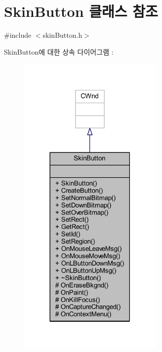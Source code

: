 \hypertarget{class_skin_button}{}\section{Skin\+Button 클래스 참조}
\label{class_skin_button}


{\ttfamily \#include $<$skin\+Button.\+h$>$}



Skin\+Button에 대한 상속 다이어그램 \+: \nopagebreak
\begin{figure}[H]
\begin{center}
\leavevmode
\includegraphics[width=201pt]{class_skin_button__inherit__graph}
\end{center}
\end{figure}


